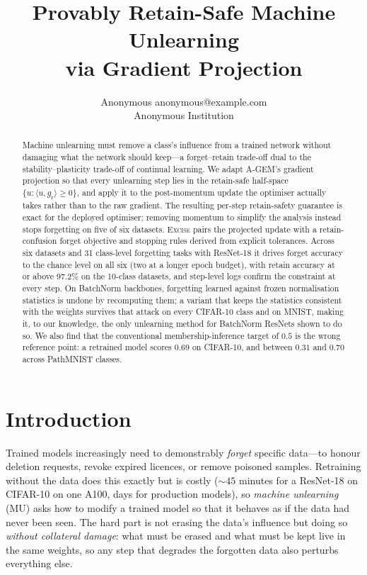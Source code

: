 \documentclass{article}
\title{Provably Retain-Safe Machine Unlearning\\ via Gradient Projection}
\author{\name Anonymous \email anonymous@example.com \\
        \addr Anonymous Institution}
\newcommand{\ours}{\textsc{Excise}}
\newcommand{\gr}{g_{\mathrm{r}}}
\newcommand{\added}[1]{{\color{revised}#1}}
\theoremstyle{remark}
\theoremstyle{plain}
\begin{document}
\maketitle

\begin{abstract}
Machine unlearning must remove a class's influence from a trained network
without damaging what the network should keep---a forget--retain trade-off dual
to the stability--plasticity trade-off of continual learning. We adapt A-GEM's
gradient projection so that every unlearning step lies in the retain-safe
half-space $\{u : \langle u,\gr\rangle \ge 0\}$, and apply it to the
post-momentum update the optimiser actually takes rather than to the raw
gradient. The resulting per-step retain-safety guarantee is exact for the
deployed optimiser; removing momentum to simplify the analysis instead stops
forgetting on five of six datasets. \ours{} pairs the projected update with a
retain-confusion forget objective and stopping rules derived from explicit
tolerances. Across six datasets and 31 class-level forgetting tasks with
ResNet-18 it drives forget accuracy to the chance level on all six (two at a
longer epoch budget), with retain accuracy at or above $97.2\%$ on the 10-class
datasets, and step-level logs confirm the constraint at every step.
\added{On BatchNorm backbones, forgetting learned against frozen normalisation
statistics is undone by recomputing them; a variant that keeps the statistics
consistent with the weights survives that attack on every CIFAR-10 class and on
MNIST, making it, to our knowledge, the only unlearning method for BatchNorm
ResNets shown to do so.} We also find that the conventional membership-inference
target of $0.5$ is the wrong reference point: a retrained model scores $0.69$ on
CIFAR-10, and between $0.31$ and $0.70$ across PathMNIST classes.
\end{abstract}

\section{Introduction}\label{sec:intro}

Trained models increasingly need to demonstrably \emph{forget} specific
data---to honour deletion requests, revoke expired licences, or remove poisoned
samples. Retraining without the data does this exactly but is costly
(${\sim}45$ minutes for a ResNet-18 on CIFAR-10 on one A100, days for production
models), so \emph{machine unlearning} (MU) asks how to modify a trained model so
that it behaves as if the data had never been seen. The hard part is not erasing
the data's influence but doing so \emph{without collateral damage}: what must be
erased and what must be kept live in the same weights, so any step that degrades
the forgotten data also perturbs everything else.
\end{document}
